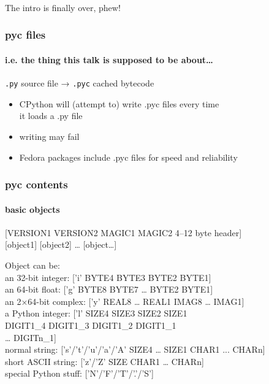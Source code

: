 \documentclass[]{beamer}
\begin{document}
\begin{frame}
  \frametitle{}

  \hfill \large{The intro is finally over, phew!} \hfill{}
\end{frame}

\begin{frame}
  \frametitle{pyc files}
  \framesubtitle{i.e. the thing this talk is supposed to be about…}

  \pause
  \vfill

  \texttt{.py} source file → \texttt{.pyc} cached bytecode
  
  \pause
  \vfill

  \begin{itemize}
  \item CPython will (attempt to) write .pyc files every time\\
    it loads a .py file
  \item writing may fail
  \item Fedora packages include .pyc files for speed and reliability 
  \end{itemize}

  \vfill
\end{frame}

\begin{frame}
  \frametitle{pyc contents}
  \framesubtitle{basic objects}

  \pause

  [VERSION1 VERSION2 MAGIC1 MAGIC2 4–12 byte header]\\
  {}[object1] [object2] … [object…]

  \vfill
  \pause

  Object can be:\\\pause
  an 32-bit integer: ['i' BYTE4 BYTE3 BYTE2 BYTE1]\\\pause
  an 64-bit float: ['g' BYTE8 BYTE7 … BYTE2 BYTE1]\\\pause
  an 2×64-bit complex: ['y' REAL8 … REAL1 IMAG8 … IMAG1]\\\pause
  a Python integer: ['l' SIZE4 SIZE3 SIZE2 SIZE1\\
    \phantom{x} \hfill DIGIT1\_4 DIGIT1\_3 DIGIT1\_2 DIGIT1\_1\phantom{]}\\
    \phantom{x} \hfill … DIGITn\_1] \\\pause
  normal string: ['s'/'t'/'u'/'a'/'A' SIZE4 … SIZE1 CHAR1 ... CHARn]\hspace*{-1em}\\\pause
  short ASCII string: ['z'/'Z' SIZE CHAR1 … CHARn]\\\pause
  special Python stuff: ['N'/'F'/'T'/'.'/'S']
\end{frame}
\end{document}
